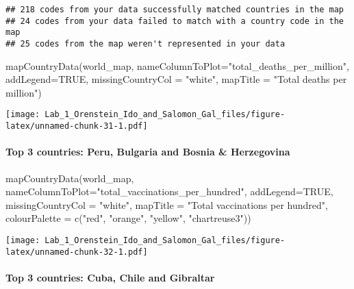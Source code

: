 \documentclass[
]{article}
\newenvironment{Shaded}{\begin{snugshade}}{\end{snugshade}}
\newcommand{\AttributeTok}[1]{\textcolor[rgb]{0.77,0.63,0.00}{#1}}
\newcommand{\ConstantTok}[1]{\textcolor[rgb]{0.00,0.00,0.00}{#1}}
\newcommand{\FunctionTok}[1]{\textcolor[rgb]{0.00,0.00,0.00}{#1}}
\newcommand{\NormalTok}[1]{#1}
\newcommand{\StringTok}[1]{\textcolor[rgb]{0.31,0.60,0.02}{#1}}
\begin{document}
\begin{verbatim}
## 218 codes from your data successfully matched countries in the map
## 24 codes from your data failed to match with a country code in the map
## 25 codes from the map weren't represented in your data
\end{verbatim}

\begin{Shaded}
\begin{Highlighting}[]
\FunctionTok{mapCountryData}\NormalTok{(world\_map, }\AttributeTok{nameColumnToPlot=}\StringTok{"total\_deaths\_per\_million"}\NormalTok{, }\AttributeTok{addLegend=}\ConstantTok{TRUE}\NormalTok{, }\AttributeTok{missingCountryCol =} \StringTok{"white"}\NormalTok{, }\AttributeTok{mapTitle =} \StringTok{"Total deaths per million"}\NormalTok{)}
\end{Highlighting}
\end{Shaded}

\texttt{[image: Lab\_1\_Orenstein\_Ido\_and\_Salomon\_Gal\_files/figure-latex/unnamed-chunk-31-1.pdf]}

\hypertarget{top-3-countries-peru-bulgaria-and-bosnia-herzegovina}{%
\paragraph{Top 3 countries: Peru, Bulgaria and Bosnia \&
Herzegovina}\label{top-3-countries-peru-bulgaria-and-bosnia-herzegovina}}

\begin{Shaded}
\begin{Highlighting}[]
\FunctionTok{mapCountryData}\NormalTok{(world\_map, }\AttributeTok{nameColumnToPlot=}\StringTok{"total\_vaccinations\_per\_hundred"}\NormalTok{, }\AttributeTok{addLegend=}\ConstantTok{TRUE}\NormalTok{,}
               \AttributeTok{missingCountryCol =} \StringTok{"white"}\NormalTok{, }\AttributeTok{mapTitle =} \StringTok{"Total vaccinations per hundred"}\NormalTok{, }\AttributeTok{colourPalette =} \FunctionTok{c}\NormalTok{(}\StringTok{"red"}\NormalTok{, }\StringTok{"orange"}\NormalTok{, }\StringTok{"yellow"}\NormalTok{, }\StringTok{"chartreuse3"}\NormalTok{))}
\end{Highlighting}
\end{Shaded}

\texttt{[image: Lab\_1\_Orenstein\_Ido\_and\_Salomon\_Gal\_files/figure-latex/unnamed-chunk-32-1.pdf]}

\hypertarget{top-3-countries-cuba-chile-and-gibraltar}{%
\paragraph{Top 3 countries: Cuba, Chile and
Gibraltar}\label{top-3-countries-cuba-chile-and-gibraltar}}
\end{document}

